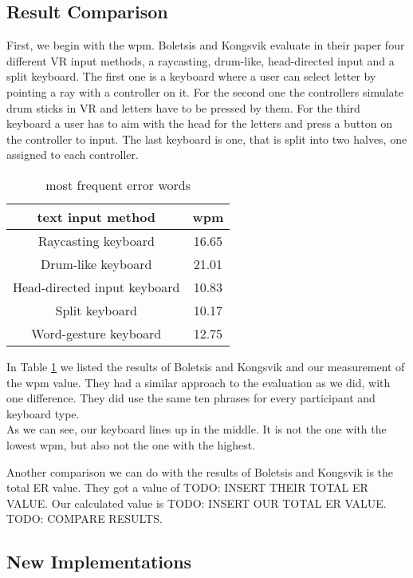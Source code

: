 \subsection{Result Comparison}
First, we begin with the wpm. Boletsis and Kongsvik \cite{Boletsis2019ControllerbasedTT} evaluate in their paper four different VR input methods, a raycasting, drum-like, head-directed input and a split keyboard. The first one is a keyboard where a user can select letter by pointing a ray with a controller on it. For the second one the controllers simulate drum sticks in VR and letters have to be pressed by them. For the third keyboard a user has to aim with the head for the letters and press a button on the controller to input. The last keyboard is one, that is split into two halves, one assigned to each controller. 
\begin{table}[ht!]
    \centering
    \caption{most frequent error words}
    \begin{tabular}{cc} \toprule
        text input method&wpm\\ \midrule
        Raycasting keyboard& 16.65\\
        Drum-like keyboard& 21.01\\
        Head-directed input keyboard& 10.83\\
        Split keyboard& 10.17\\
        Word-gesture keyboard& 12.75\\
        \bottomrule
    \end{tabular}
    \label{tab:wpm_compare}
\end{table}

In Table \ref{tab:wpm_compare} we listed the results of Boletsis and Kongsvik \cite{Boletsis2019ControllerbasedTT} and our measurement of the wpm value. They had a similar approach to the evaluation as we did, with one difference. They did use the same ten phrases for every participant and keyboard type.\\
As we can see, our keyboard lines up in the middle. It is not the one with the lowest wpm, but also not the one with the highest.

Another comparison we can do with the results of Boletsis and Kongsvik \cite{Boletsis2019ControllerbasedTT} is the total ER value. They got a value of TODO: INSERT THEIR TOTAL ER VALUE. Our calculated value is TODO: INSERT OUR TOTAL ER VALUE. TODO: COMPARE RESULTS.

\subsection{New Implementations}